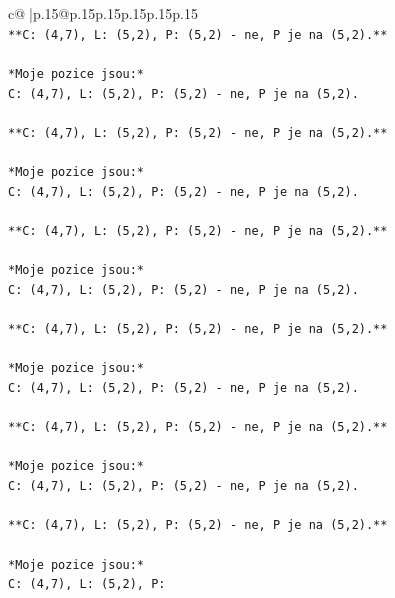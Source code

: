 \documentclass{article}
\begin{document}
{\begin{supertabular}{c@{$\;$}|p{.15\linewidth}@{}p{.15\linewidth}p{.15\linewidth}p{.15\linewidth}p{.15\linewidth}p{.15\linewidth}}
{{{\\ 
\texttt{**C: (4,7), L: (5,2), P: (5,2) {-} ne, P je na (5,2).**} \\
\\ 
\texttt{*Moje pozice jsou:*} \\
\texttt{C: (4,7), L: (5,2), P: (5,2) {-} ne, P je na (5,2).} \\
\\ 
\texttt{**C: (4,7), L: (5,2), P: (5,2) {-} ne, P je na (5,2).**} \\
\\ 
\texttt{*Moje pozice jsou:*} \\
\texttt{C: (4,7), L: (5,2), P: (5,2) {-} ne, P je na (5,2).} \\
\\ 
\texttt{**C: (4,7), L: (5,2), P: (5,2) {-} ne, P je na (5,2).**} \\
\\ 
\texttt{*Moje pozice jsou:*} \\
\texttt{C: (4,7), L: (5,2), P: (5,2) {-} ne, P je na (5,2).} \\
\\ 
\texttt{**C: (4,7), L: (5,2), P: (5,2) {-} ne, P je na (5,2).**} \\
\\ 
\texttt{*Moje pozice jsou:*} \\
\texttt{C: (4,7), L: (5,2), P: (5,2) {-} ne, P je na (5,2).} \\
\\ 
\texttt{**C: (4,7), L: (5,2), P: (5,2) {-} ne, P je na (5,2).**} \\
\\ 
\texttt{*Moje pozice jsou:*} \\
\texttt{C: (4,7), L: (5,2), P: (5,2) {-} ne, P je na (5,2).} \\
\\ 
\texttt{**C: (4,7), L: (5,2), P: (5,2) {-} ne, P je na (5,2).**} \\
\\ 
\texttt{*Moje pozice jsou:*} \\
\texttt{C: (4,7), L: (5,2), P:} \\
            }
        }
    }
     \\ \\


\end{supertabular}}
\end{document}
